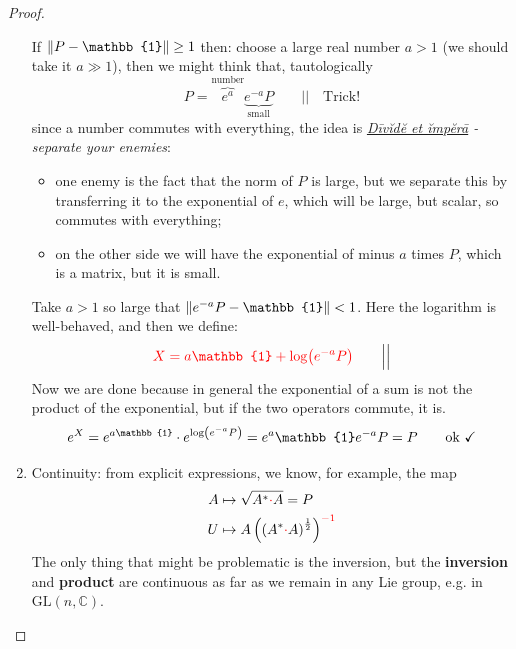 \documentclass[../main.tex]{subfiles}
\begin{document}
\begin{proof}
\begin{enumerate}
    If $\norm{P-\mathbb{1}}\geq 1$ then: choose a large real number $a>1$ (we should take it $a\gg 1$), then we might think that, tautologically
    \[
    P=\overbrace{e^a}^{\textrm{number}}\underbrace{e^{-a}P}_{\textrm{small}} \qquad \Big|\Big| \quad \textrm{Trick!}
    \]
    since a number commutes with everything, the idea is \textit{\href{https://it.wikipedia.org/wiki/Divide_et_impera}{Dīvĭdĕ et ĭmpĕrā} - separate your enemies}: 
    \begin{itemize}
        \item one enemy is the fact that the norm of $P$ is large, but we separate this by transferring it to the exponential of $e$, which will be large, but scalar, so commutes with everything;
        \item on the other side we will have the exponential of minus $a$ times $P$, which is a matrix, but it is small.
    \end{itemize}
    Take $a>1$ so large that $\norm{e^{-a}P-\mathbb{1}}<1$. Here the logarithm is well-behaved, and then we define:
    \[
    {\color{red}X=a\mathbb{1}+\log(e^{-a}P)} \qquad \Big|\Big|
    \]
    Now we are done because in general the exponential of a sum is not the product of the exponential, but if the two operators commute, it is.
    \[
    e^X=e^{a\mathbb{1}}\cdot e^{\log(e^{-a}P)}=e^{a}\mathbb{1}e^{-a}P=P \qquad \textrm{ok \checkmark} 
    \]
    \item Continuity: from explicit expressions, we know, for example, the map
    \[
    \begin{split}
    A&\mapsto \sqrt{A^\ast{\color{red}\cdot} A}=P\\
    U&\mapsto A\left(\left(A^\ast{\color{red}\cdot} A\right)^{\frac{1}{2}}\right)^{{\color{red}-1}}
    \end{split}
    \]
    The only thing that might be problematic is the inversion, but the \textbf{inversion} and \textbf{product} are continuous as far as we remain in any Lie group, e.g. in $\textrm{GL}(n,\mathbb{C})$.
\end{enumerate}
\end{proof}
\end{document}
